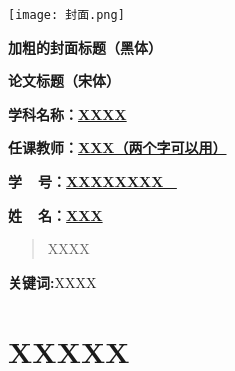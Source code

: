 \documentclass[a4paper]{article}
\title{} %
\begin{document}
    \begin{center}  %
        \thispagestyle{empty} %
       
        \texttt{[image: 封面.png]} %
       
        \vspace{2cm} %

        {\heiti  \fontsize{48pt}{1.5} \textbf{加粗的封面标题（黑体）}}

        \vspace{4cm} %

        {\songti \huge \textbf{论文标题（宋体）}}

        \vspace{6cm} %

        {\heiti  \fontsize{15pt}{1} \textbf{学科名称：\underline{\qquad XXXX \qquad}}}

        {\heiti  \fontsize{15pt}{1} \textbf{任课教师：\underline{\qquad  XXX（两个字可以用）  \qquad}}}



        {\heiti  \fontsize{15pt}{1} \textbf{学\quad \ \ 号：\underline{\quad  XXXXXXXX \ \quad}}}



        {\heiti  \fontsize{15pt}{1} \textbf{姓\quad \ \ 名：\underline{\qquad XXX \qquad}}}

    \end{center}
\maketitle
\thispagestyle{empty} %

\begin{abstract}
XXXX
\end{abstract} %
\par\textbf{关键词:}XXXX

\clearpage  %

\thispagestyle{empty} %

\tableofcontents    %

\clearpage  %

\setcounter{page}{1} %

\section{XXXXX} %
\end{document}
